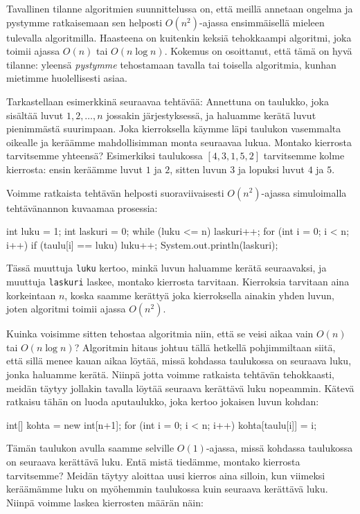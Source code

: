Tavallinen tilanne algoritmien suunnittelussa on,
että meillä annetaan ongelma ja pystymme ratkaisemaan sen
helposti $O(n^2)$-ajassa ensimmäisellä mieleen tulevalla algoritmilla.
Haasteena on kuitenkin keksiä tehokkaampi algoritmi,
joka toimii ajassa $O(n)$ tai $O(n \log n)$.
Kokemus on osoittanut, että tämä on hyvä tilanne:
yleensä \emph{pystymme} tehostamaan
tavalla tai toisella algoritmia,
kunhan mietimme huolellisesti asiaa.

Tarkastellaan esimerkkinä seuraavaa tehtävää:
Annettuna on taulukko, joka sisältää luvut $1,2,\dots,n$
jossakin järjestyksessä,
ja haluamme kerätä luvut pienimmästä suurimpaan.
Joka kierroksella käymme läpi taulukon vasemmalta
oikealle ja keräämme mahdollisimman monta seuraavaa lukua.
Montako kierrosta tarvitsemme yhteensä?
Esimerkiksi taulukossa $[4,3,1,5,2]$
tarvitsemme kolme kierrosta:
ensin keräämme luvut $1$ ja $2$,
sitten luvun $3$ ja lopuksi luvut $4$ ja $5$.

Voimme ratkaista tehtävän helposti suoraviivaisesti $O(n^2)$-ajassa
simuloimalla tehtävänannon kuvaamaa prosessia:

\begin{code}
int luku = 1;
int laskuri = 0;
while (luku <= n) {
    laskuri++;
    for (int i = 0; i < n; i++) {
        if (taulu[i] == luku) luku++;
    }
}
System.out.println(laskuri);
\end{code}

Tässä muuttuja \texttt{luku} kertoo,
minkä luvun haluamme kerätä seuraavaksi,
ja muuttuja \texttt{laskuri} laskee,
montako kierrosta tarvitaan.
Kierroksia tarvitaan aina korkeintaan $n$,
koska saamme kerättyä joka kierroksella
ainakin yhden luvun,
joten algoritmi toimii ajassa $O(n^2)$.

Kuinka voisimme sitten tehostaa algoritmia niin,
että se veisi aikaa vain $O(n)$ tai $O(n \log n)$?
Algoritmin hitaus johtuu tällä hetkellä pohjimmiltaan siitä,
että sillä menee kauan aikaa löytää,
missä kohdassa taulukossa on seuraava luku,
jonka haluamme kerätä.
Niinpä jotta voimme ratkaista tehtävän tehokkaasti,
meidän täytyy jollakin tavalla löytää seuraava kerättävä luku nopeammin.
Kätevä ratkaisu tähän on luoda aputaulukko,
joka kertoo jokaisen luvun kohdan:

\begin{code}
int[] kohta = new int[n+1];
for (int i = 0; i < n; i++) {
    kohta[taulu[i]] = i;
}
\end{code}

Tämän taulukon avulla saamme selville $O(1)$-ajassa,
missä kohdassa taulukossa on seuraava kerättävä luku.
Entä mistä tiedämme, montako kierrosta tarvitsemme?
Meidän täytyy aloittaa uusi kierros aina silloin,
kun viimeksi keräämämme luku on myöhemmin taulukossa
kuin seuraava kerättävä luku.
Niinpä voimme laskea kierrosten määrän näin:


